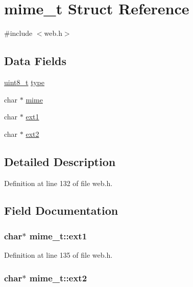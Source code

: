 \hypertarget{structmime__t}{}\section{mime\+\_\+t Struct Reference}
\label{structmime__t}


{\ttfamily \#include $<$web.\+h$>$}

\subsection*{Data Fields}
\begin{DoxyCompactItemize}
\item 
\hyperlink{send_8c_aba7bc1797add20fe3efdf37ced1182c5}{uint8\+\_\+t} \hyperlink{structmime__t_ae69826dcfd475d65fa0fe8a1574bb3af}{type}
\item 
char $\ast$ \hyperlink{structmime__t_ad796d16eaee60d7435bff66b2e9b8a8d}{mime}
\item 
char $\ast$ \hyperlink{structmime__t_a22af12abb536a48d3425a3a4d1cce2a4}{ext1}
\item 
char $\ast$ \hyperlink{structmime__t_ae16e9342ecd4df97a2564658f1f506b1}{ext2}
\end{DoxyCompactItemize}


\subsection{Detailed Description}


Definition at line 132 of file web.\+h.



\subsection{Field Documentation}
\subsubsection[{\texorpdfstring{ext1}{ext1}}]{\setlength{\rightskip}{0pt plus 5cm}char$\ast$ mime\+\_\+t\+::ext1}\hypertarget{structmime__t_a22af12abb536a48d3425a3a4d1cce2a4}{}\label{structmime__t_a22af12abb536a48d3425a3a4d1cce2a4}


Definition at line 135 of file web.\+h.

\subsubsection[{\texorpdfstring{ext2}{ext2}}]{\setlength{\rightskip}{0pt plus 5cm}char$\ast$ mime\+\_\+t\+::ext2}\hypertarget{structmime__t_ae16e9342ecd4df97a2564658f1f506b1}{}\label{structmime__t_ae16e9342ecd4df97a2564658f1f506b1}


